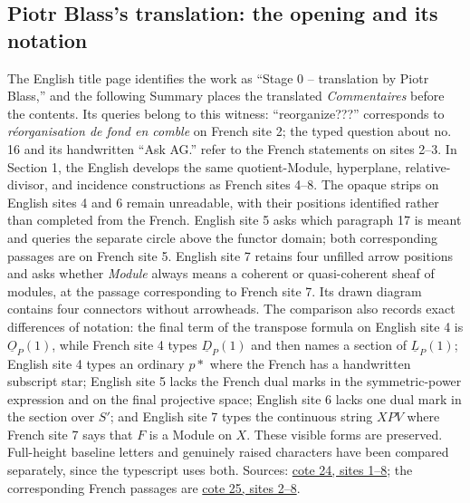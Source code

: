 \documentclass[10pt,a4paper]{article}
\begin{document}
\subsection*{Piotr Blass's translation: the opening and its notation}
The English title page identifies the work as ``Stage 0 -- translation by Piotr Blass,'' and the following Summary places the translated \emph{Commentaires} before the contents. Its queries belong to this witness: ``reorganize???'' corresponds to \emph{réorganisation de fond en comble} on French site 2; the typed question about no.\,16 and its handwritten ``Ask AG.'' refer to the French statements on sites 2--3. In Section 1, the English develops the same quotient-Module, hyperplane, relative-divisor, and incidence constructions as French sites 4--8. The opaque strips on English sites 4 and 6 remain unreadable, with their positions identified rather than completed from the French. English site 5 asks which paragraph 17 is meant and queries the separate circle above the functor domain; both corresponding passages are on French site 5. English site 7 retains four unfilled arrow positions and asks whether \emph{Module} always means a coherent or quasi-coherent sheaf of modules, at the passage corresponding to French site 7. Its drawn diagram contains four connectors without arrowheads. The comparison also records exact differences of notation: the final term of the transpose formula on English site 4 is $\underline O_P(1)$, while French site 4 types $\underline D_P(1)$ and then names a section of $\underline L_P(1)$; English site 4 types an ordinary $p*$ where the French has a handwritten subscript star; English site 5 lacks the French dual marks in the symmetric-power expression and on the final projective space; English site 6 lacks one dual mark in the section over $S'$; and English site 7 types the continuous string $XPV$ where French site 7 says that $F$ is a Module on $X$. These visible forms are preserved. Full-height baseline letters and genuinely raised characters have been compared separately, since the typescript uses both. Sources: \href{https://grothendieck.umontpellier.fr/web/viewer.html?file=../24.pdf\#page=2}{cote 24, sites 1--8}; the corresponding French passages are \href{https://grothendieck.umontpellier.fr/web/viewer.html?file=../25.pdf\#page=3}{cote 25, sites 2--8}.
\par{}

\par{}
\end{document}
